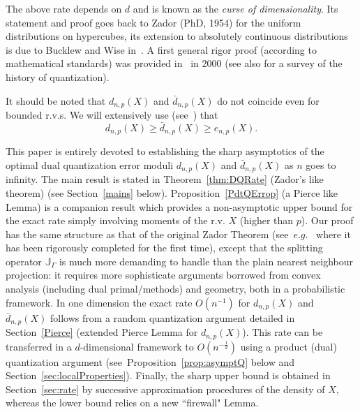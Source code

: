 The above  rate depends on $d$ and  is known as the {\em curse of dimensionality}.
 Its statement  and proof goes back to Zador (PhD, 1954) for the uniform distributions on hypercubes, its 
extension to   absolutely  continuous distributions is due to 
Bucklew and Wise in~\cite{bucklew}. A first general rigor proof 
 (according to mathematical  standards) was provided 
in~\cite{Foundations} in 2000 (see also \cite{GRAY} for a survey of the history of quantization).

\smallskip
It should be noted that $d_{n,p}(X)$ and $\bar d_{n,p}(X)$ do not coincide even for bounded r.v.s. We will extensively use (see~\cite{dualStat}) that
\[
 d_{n,p}(X)\ge  \bar d_{n,p}(X)\ge e_{n,p}(X).
\]

This paper is entirely devoted to establishing the sharp asymptotics of the
optimal dual quantization error moduli $d_{n,p}(X)$ and $\bar d_{n,p}(X)$ as $n$ goes to infinity. 
The main result is stated in Theorem~\ref{thm:DQRate} (Zador's like theorem)
(see Section~\ref{mains} below). 
Proposition~\ref{PdtQErrop} (a Pierce like Lemma) is a companion result
which provides a non-asymptotic upper bound for the exact rate simply involving  
moments of the r.v. $X$ (higher than $p$).  Our   proof   has the same structure  as that of the original Zador  Theorem (see~$e.g.$~\cite{Foundations} where it has been rigorously completed for   the first time), except that the  splitting operator $\mathbb{J}_{\Gamma}$ is much more demanding to handle than the plain nearest neighbour projection: it requires more sophisticate arguments borrowed from convex analysis (including dual primal/methods) and geometry,  both in  a probabilistic framework.  In one dimension the exact rate $O(n^{-1})$ for $d_{n,p}(X)$ and $\bar d_{n,p}(X)$ follows from a random quantization argument detailed in Section~\ref{Pierce} (extended Pierce Lemma for $d_{n,p}(X)$).
This rate can be transferred in a $d$-dimensional framework  to  $O(n^{-\frac
1d})$  using  a product (dual) quantization
argument (see~Proposition~\ref{prop:asymptQ} below and Section~\ref{sec:localProperties}). Finally, the sharp upper bound
is obtained in Section~\ref{sec:rate} by successive approximation procedures of
the density of $X$,  whereas the lower bound relies on a new ``firewall" Lemma.

